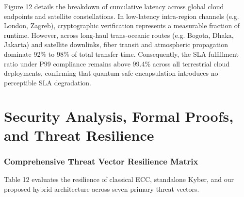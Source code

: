 \documentclass[5p,times]{elsarticle}
\begin{document}
Figure 12 details the breakdown of cumulative latency across global cloud endpoints and satellite constellations. In low-latency intra-region channels (e.g. London, Zagreb), cryptographic verification represents a measurable fraction of runtime. However, across long-haul trans-oceanic routes (e.g. Bogota, Dhaka, Jakarta) and satellite downlinks, fiber transit and atmospheric propagation dominate 92\% to 98\% of total transfer time. Consequently, the SLA fulfillment ratio under P99 compliance remains above 99.4\% across all terrestrial cloud deployments, confirming that quantum-safe encapsulation introduces no perceptible SLA degradation.


\FloatBarrier
\section{Security Analysis, Formal Proofs, and Threat Resilience}


\subsubsection{Comprehensive Threat Vector Resilience Matrix}

Table 12 evaluates the resilience of classical ECC, standalone Kyber, and our proposed hybrid architecture across seven primary threat vectors.
\end{document}
